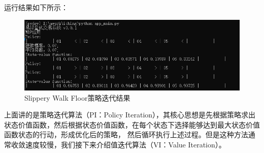 运行结果如下所示：
\begin{figure}[H]
	\caption{Slippery Walk Floor策略迭代结果}
	\label{p000011}
	\centering
	\includegraphics[width=15cm]{images/p000011}
\end{figure}
上面讲的是策略迭代算法（PI：Policy Iteration），其核心思想是先根据策略求出状态价值函数，然后根据状态价值函数，在每个状态下选择能够达到最大状态价值函数状态的行动，形成优化后的策略，
然后循环执行上述过程。但是这种方法通常收敛速度较慢，我们接下来介绍值迭代算法（VI：Value Iteration）。
